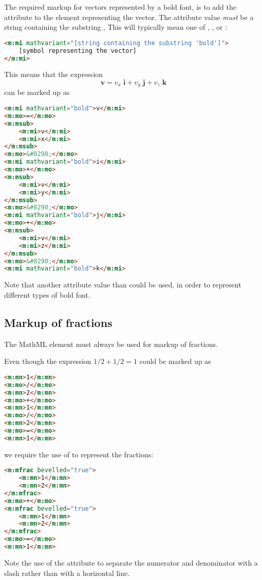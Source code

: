 \documentclass[english,a4paper,11pt]{article}
\begin{document}
\medskip The required markup for vectors represented by a bold font, is to add the  attribute to the  element representing the vector. The attribute value \emph{must} be a string containing the substring , This will typically mean one of , ,  or :
\begin{lstlisting}[language=HTML]
<m:mi mathvariant="[string containing the substring 'bold']">
	[symbol representing the vector]
</m:mi>
\end{lstlisting}
This means that the expression
\begin{equation}
\mathbf{v} = v_x\;  \mathbf{i} + v_y\; \mathbf{j} + v_z\;  \mathbf{k}
\end{equation}
can be marked up as
\begin{lstlisting}[language=HTML]
<m:mi mathvariant="bold">v</m:mi>
<m:mo>=</m:mo>
<m:msub>
	<m:mi>v</m:mi>
	<m:mi>x</m:mi>
</m:msub>
<m:mo>&#8290;</m:mo>
<m:mi mathvariant="bold">i</m:mi>
<m:mo>+</m:mo>
<m:msub>
	<m:mi>v</m:mi>
	<m:mi>y</m:mi>
</m:msub>
<m:mo>&#8290;</m:mo>
<m:mi mathvariant="bold">j</m:mi>
<m:mo>+</m:mo>
<m:msub>
	<m:mi>v</m:mi>
	<m:mi>z</m:mi>
</m:msub>
<m:mo>&#8290;</m:mo>
<m:mi mathvariant="bold">k</m:mi>
\end{lstlisting}
Note that another attribute value than  could be used, in order to represent different types of bold font.

\subsection{Markup of fractions}
The MathML element  must always be used for markup of fractions.

Even though the expression $1/2 + 1/2 =1$ could be marked up as
\begin{lstlisting}[language=HTML]
<m:mn>1</m:mn>
<m:mo>/</m:mo>
<m:mn>2</m:mn>
<m:mo>+</m:mo>
<m:mn>1</m:mn>
<m:mo>/</m:mo>
<m:mn>2</m:mn>
<m:mo>=</m:mo>
<m:mn>1</m:mn>
\end{lstlisting}
we require the use of  to represent the fractions:
\begin{lstlisting}[language=HTML]
<m:mfrac bevelled="true">
	<m:mn>1</m:mn>
	<m:mn>2</m:mn>
</m:mfrac>
<m:mo>+</m:mo>
<m:mfrac bevelled="true">
	<m:mn>1</m:mn>
	<m:mn>2</m:mn>
</m:mfrac>
<m:mo>=</m:mo>
<m:mn>1</m:mn>
\end{lstlisting}
Note the use of the  attribute to separate the numerator and denominator  with a slash rather than with a horizontal line.
\end{document}

